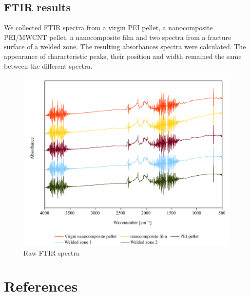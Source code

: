 \documentclass[11pt,review,times]{article}
\begin{document}
\subsection{FTIR results}
\FloatBarrier

We collected FTIR spectra from a virgin PEI pellet, a nanocomposite PEI/MWCNT pellet, a nanocomposite film and two spectra from a fracture surface of a welded zone. 
The resulting absorbances spectra were calculated. 
The appearance of characteristic peaks, their position and width remained the same between the different spectra. 

\begin{figure}[h]
	\center
	\includegraphics[width=\textwidth]{FTIR_spectra.pdf}
	\caption{Raw FTIR spectra}
	\label{fig:FTIR_spectra}
\end{figure}



\FloatBarrier
							\section{References}




\end{document}
